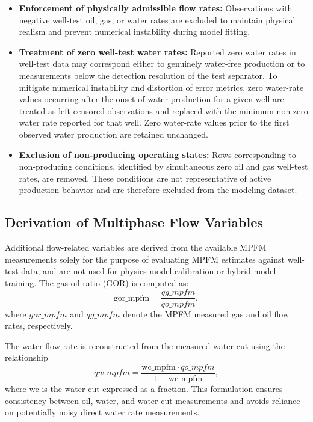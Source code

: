 \documentclass[12pt,APA]{uomthesis}
\begin{document}
\begin{itemize}
    \item \textbf{Enforcement of physically admissible flow rates:}  
    Observations with negative well-test oil, gas, or water rates are excluded to maintain physical realism and prevent numerical instability during model fitting.

    \item \textbf{Treatment of zero well-test water rates:}  
    Reported zero water rates in well-test data may correspond either to genuinely water-free production or to measurements below the detection resolution of the test separator. To mitigate numerical instability and distortion of error metrics, zero water-rate values occurring after the onset of water production for a given well are treated as left-censored observations and replaced with the minimum non-zero water rate reported for that well. Zero water-rate values prior to the first observed water production are retained unchanged.

    \item \textbf{Exclusion of non-producing operating states:}  
    Rows corresponding to non-producing conditions, identified by simultaneous zero oil and gas well-test rates, are removed. These conditions are not representative of active production behavior and are therefore excluded from the modeling dataset.
\end{itemize}


\subsection{Derivation of Multiphase Flow Variables}
Additional flow-related variables are derived from the available MPFM measurements solely for the purpose of evaluating MPFM estimates against well-test data, and are not used for physics-model calibration or hybrid model training.
The gas-oil ratio (GOR) is computed as:
\begin{equation}
\text{gor\_mpfm} = \frac{qg\_mpfm}{qo\_mpfm},
\end{equation}
where $gor\_mpfm$ and $qg\_mpfm$ denote the MPFM measured gas and oil flow rates, respectively.

The water flow rate is reconstructed from the measured water cut using the relationship
\begin{equation}
qw\_mpfm = \frac{\text{wc\_mpfm} \cdot qo\_mpfm}{1 - \text{wc\_mpfm}},
\end{equation}
where $\text{wc}$ is the water cut expressed as a fraction. This formulation ensures consistency between oil, water, and water cut measurements and avoids reliance on potentially noisy direct water rate measurements.
\end{document}
